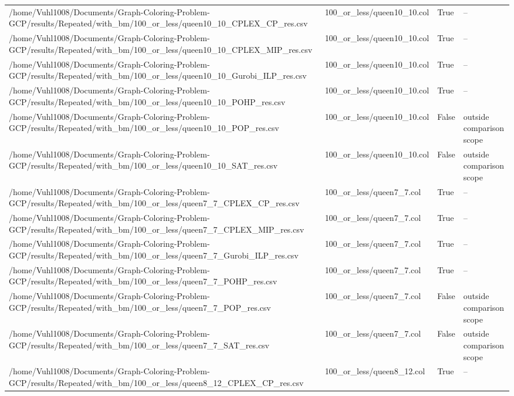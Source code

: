 \begin{table}[htbp]
\begin{tabular}{llll}
/home/Vuhl1008/Documents/Graph-Coloring-Problem-GCP/results/Repeated/with\_bm/100\_or\_less/queen10\_10\_CPLEX\_CP\_res.csv & 100\_or\_less/queen10\_10.col & True & -- \\
/home/Vuhl1008/Documents/Graph-Coloring-Problem-GCP/results/Repeated/with\_bm/100\_or\_less/queen10\_10\_CPLEX\_MIP\_res.csv & 100\_or\_less/queen10\_10.col & True & -- \\
/home/Vuhl1008/Documents/Graph-Coloring-Problem-GCP/results/Repeated/with\_bm/100\_or\_less/queen10\_10\_Gurobi\_ILP\_res.csv & 100\_or\_less/queen10\_10.col & True & -- \\
/home/Vuhl1008/Documents/Graph-Coloring-Problem-GCP/results/Repeated/with\_bm/100\_or\_less/queen10\_10\_POHP\_res.csv & 100\_or\_less/queen10\_10.col & True & -- \\
/home/Vuhl1008/Documents/Graph-Coloring-Problem-GCP/results/Repeated/with\_bm/100\_or\_less/queen10\_10\_POP\_res.csv & 100\_or\_less/queen10\_10.col & False & outside comparison scope \\
/home/Vuhl1008/Documents/Graph-Coloring-Problem-GCP/results/Repeated/with\_bm/100\_or\_less/queen10\_10\_SAT\_res.csv & 100\_or\_less/queen10\_10.col & False & outside comparison scope \\
/home/Vuhl1008/Documents/Graph-Coloring-Problem-GCP/results/Repeated/with\_bm/100\_or\_less/queen7\_7\_CPLEX\_CP\_res.csv & 100\_or\_less/queen7\_7.col & True & -- \\
/home/Vuhl1008/Documents/Graph-Coloring-Problem-GCP/results/Repeated/with\_bm/100\_or\_less/queen7\_7\_CPLEX\_MIP\_res.csv & 100\_or\_less/queen7\_7.col & True & -- \\
/home/Vuhl1008/Documents/Graph-Coloring-Problem-GCP/results/Repeated/with\_bm/100\_or\_less/queen7\_7\_Gurobi\_ILP\_res.csv & 100\_or\_less/queen7\_7.col & True & -- \\
/home/Vuhl1008/Documents/Graph-Coloring-Problem-GCP/results/Repeated/with\_bm/100\_or\_less/queen7\_7\_POHP\_res.csv & 100\_or\_less/queen7\_7.col & True & -- \\
/home/Vuhl1008/Documents/Graph-Coloring-Problem-GCP/results/Repeated/with\_bm/100\_or\_less/queen7\_7\_POP\_res.csv & 100\_or\_less/queen7\_7.col & False & outside comparison scope \\
/home/Vuhl1008/Documents/Graph-Coloring-Problem-GCP/results/Repeated/with\_bm/100\_or\_less/queen7\_7\_SAT\_res.csv & 100\_or\_less/queen7\_7.col & False & outside comparison scope \\
/home/Vuhl1008/Documents/Graph-Coloring-Problem-GCP/results/Repeated/with\_bm/100\_or\_less/queen8\_12\_CPLEX\_CP\_res.csv & 100\_or\_less/queen8\_12.col & True & -- \\

\end{tabular}
\end{table}
